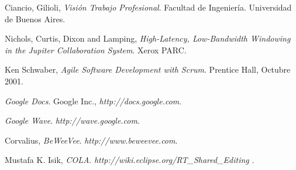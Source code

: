 \documentclass[12pt,a4paper]{article}
\begin{document}
\newpage
\begin{thebibliography}{9}
	Ciancio, Gilioli,
	\emph{Visión Trabajo Profesional}.
	Facultad de Ingeniería.
	Universidad de Buenos Aires. 

	Nichols, Curtis, Dixon and Lamping,
	\emph{High-Latency, Low-Bandwidth Windowing in the Jupiter Collaboration System}.
	Xerox PARC.

	Ken Schwaber,
	\emph{Agile Software Development with Scrum}.
	Prentice Hall, 
	Octubre 2001.
	
	\emph{Google Docs}. 
	Google Inc., 
	\textsl{http://docs.google.com}.
	
	\emph{Google Wave}. 
	\textsl{http://wave.google.com}.

	Corvalius,
	\emph{BeWeeVee}. 
	\textsl{http://www.beweevee.com}.
	
	Mustafa K. Isik,
	\emph{COLA}. 
	\textsl{ http://wiki.eclipse.org/RT\_Shared\_Editing }.

		
\end{thebibliography}
\end{document}
